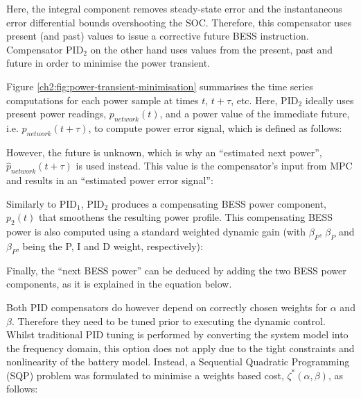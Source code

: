 

Here, the integral component removes steady-state error and the instantaneous error differential bounds overshooting the SOC.
Therefore, this compensator uses present (and past) values to issue a corrective future BESS instruction.
Compensator PID$_2$ on the other hand uses values from the present, past and future in order to minimise the power transient.



Figure \ref{ch2:fig:power-transient-minimisation} summarises the time series computations for each power sample at times $t$, $t+\tau$, etc.
Here, PID$_2$ ideally uses present power readings, $p_{network}(t)$, and a power value of the immediate future, i.e. $p_{network}(t+\tau)$, to compute power error signal, which is defined as follows:



However, the future is unknown, which is why an ``estimated next power'', $\hat{p}_{network}(t+\tau)$ is used instead.
This value is the compensator's input from MPC and results in an ``estimated power error signal'':



Similarly to PID$_1$, PID$_2$ produces a compensating BESS power component, $p_2(t)$ that smoothens the resulting power profile.
This compensating BESS power is also computed using a standard weighted dynamic gain (with $\beta_P$, $\beta_P$ and $\beta_P$, being the P, I and D weight, respectively):



Finally, the ``next BESS power'' can be deduced by adding the two BESS power components, as it is explained in the equation below.



Both PID compensators do however depend on correctly chosen weights for $\alpha$ and $\beta$.
Therefore they need to be tuned prior to executing the dynamic control.
Whilst traditional PID tuning is performed by converting the system model into the frequency domain, this option does not apply due to the tight constraints and nonlinearity of the battery model. 
Instead, a Sequential Quadratic Programming (SQP) problem was formulated to minimise a weights based cost, $\zeta^*(\alpha, \beta)$, as follows:

